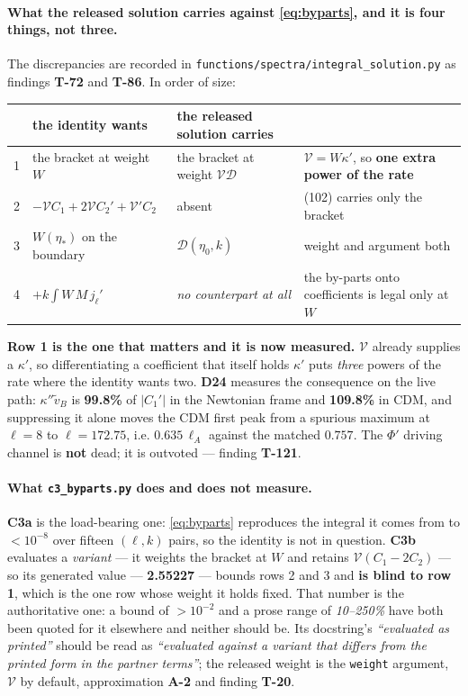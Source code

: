 \paragraph{What the released solution carries against
\eqref{eq:byparts}, and it is four things, not three.} The discrepancies are
recorded in \texttt{functions/spectra/integral\_solution.py} as findings
\textbf{T-72} and \textbf{T-86}. In order of size:

\begin{center}\small
\begin{tabular}{@{}clll@{}}
\toprule
 & the identity wants & the released solution carries & \\
\midrule
1 & the bracket at weight $W$ & the bracket at weight $\mathcal V\mathcal D$ &
  $\mathcal V=W\kappa'$, so \textbf{one extra power of the rate} \\
2 & $-\mathcal VC_1+2\mathcal VC_2'+\mathcal V'C_2$ & absent &
  (102) carries only the bracket \\
3 & $W(\eta_\ast)$ on the boundary & $\mathcal D(\eta_0,k)$ &
  weight and argument both \\
4 & $+k\int W\,M\,j_\ell'$ & \emph{no counterpart at all} &
  the by-parts onto coefficients is legal only at $W$ \\
\bottomrule
\end{tabular}
\end{center}

\noindent
\textbf{Row 1 is the one that matters and it is now measured.} $\mathcal V$
already supplies a $\kappa'$, so differentiating a coefficient that itself
holds $\kappa'$ puts \emph{three} powers of the rate where the identity wants
two. \textbf{D24} measures the consequence on the live path:
$\kappa''\tilde v_B$ is \textbf{99.8\%} of $|C_1'|$ in the Newtonian frame and
\textbf{109.8\%} in CDM, and suppressing it alone moves the CDM first peak from
a spurious maximum at $\ell=8$ to $\ell=172.75$, i.e. $0.635\,\ell_A$ against
the matched $0.757$. The $\Phi'$ driving channel is \textbf{not} dead; it is
outvoted --- finding \textbf{T-121}.

\paragraph{What \texttt{c3\_byparts.py} does and does not measure.}
\textbf{C3a} is the load-bearing one: \eqref{eq:byparts} reproduces the
integral it comes from to $<10^{-8}$ over fifteen $(\ell,k)$ pairs, so the
identity is not in question. \textbf{C3b} evaluates a \emph{variant} --- it
weights the bracket at $W$ and retains $\mathcal V(C_1-2C_2)$ --- so its
generated value --- \textbf{2.55227} --- bounds rows 2 and 3 and \textbf{is
blind to row 1}, which is the one row whose weight it holds fixed. That number
is the authoritative one: a bound of $>10^{-2}$ and a prose range of
\emph{10--250\%} have both been quoted for it elsewhere and neither should be. Its docstring's \emph{``evaluated as
printed''} should be read as \emph{``evaluated against a variant that differs
from the printed form in the partner terms''}; the released weight is the
\texttt{weight} argument, $\mathcal V$ by default, approximation \textbf{A-2}
and finding \textbf{T-20}.

